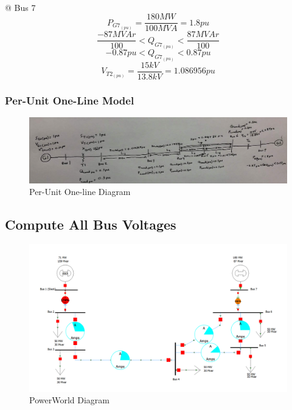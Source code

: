 \documentclass[12pt]{article}
\begin{document}
        \ \\
        @ Bus 7
        $$P_{G7_{(pu)}}=\frac{180MW}{100MVA}=\boxed{1.8pu}$$
        $$\frac{-87MVAr}{100}<Q_{G7_{(pu)}}<\frac{87MVAr}{100}$$
        $$-0.87pu<Q_{G7_{(pu)}}<0.87pu$$
        $$V_{T2_{(pu)}}=\frac{15kV}{13.8kV}=\boxed{1.086956pu}$$
        
        \subsubsection{Per-Unit One-Line Model}
        \begin{figure}[H]
            \centerline{\includegraphics[scale=0.5]{images/oneLine}}
            \caption{Per-Unit One-line Diagram}
        \end{figure}

        \subsection{Compute All Bus Voltages}
        \begin{figure}[H]
            \centerline{\includegraphics[scale=0.3]{images/PowerWorld}}
            \caption{PowerWorld Diagram}
        \end{figure}
        
\end{document}
